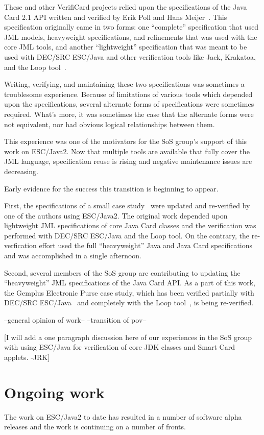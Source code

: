 \documentclass{acm_proc_article-sp}
\begin{document}
These and other VerifiCard projects relied upon the specifications of
the Java Card 2.1 API written and verified by Erik Poll and Hans
Meijer~\cite{MeijerPoll01}.  This specification originally came in two
forms: one ``complete'' specification that used JML models,
heavyweight specifications, and refinements that was used with the
core JML tools, and another ``lightweight'' specification that was
meant to be used with DEC/SRC ESC/Java and other verification tools
like Jack, Krakatoa, and the Loop tool~\cite{a,b,c}.

Writing, verifying, and maintaining these two specifications was
sometimes a troublesome experience.  Because of limitations of various
tools which depended upon the specifications, several alternate forms
of specifications were sometimes required.  What's more, it was
sometimes the case that the alternate forms were not equivalent, nor
had obvious logical relationships between them.

This experience was one of the motivators for the SoS group's support
of this work on ESC/Java2.  Now that multiple tools are available that
fully cover the JML language, specification reuse is rising and
negative maintenance issues are decreasing.  

Early evidence for the success this transition is beginning to appear.

First, the specifications of a small case
study~\cite{BreunesseJacobsBerg02} were updated and re-verified by one
of the authors using ESC/Java2.  The original work depended upon
lightweight JML specifications of core Java Card classes and the
verification was performed with DEC/SRC ESC/Java and the Loop tool.
On the contrary, the re-verfication effort used the full
``heavyweight'' Java and Java Card specifications and was accomplished
in a single afternoon.

Second, several members of the SoS group are contributing to updating
the ``heavyweight'' JML specifications of the Java Card API.  As a
part of this work, the Gemplus Electronic Purse case study, which has
been verified partially with DEC/SRC ESC/Java~\cite{CatanoHuisman02}
and completely with the Loop tool~\cite{JoachimsThesis?}, is being
re-verified.

--general opinion of work--
--transition of pov--

[I will add a one paragraph discussion here of our experiences in
the SoS group with using ESC/Java for verification of core JDK classes
and Smart Card applets. -JRK]

\section{Ongoing work}
The work on ESC/Java2 to date has resulted in a number of software
alpha releases and the work is continuing on a number of fronts.
\end{document}
